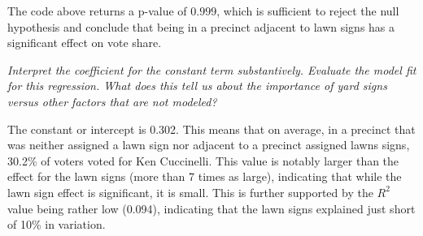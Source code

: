 \documentclass[12pt,a4paper]{article}
\begin{document}


\noindent The code above returns a p-value of $0.999$, which is sufficient to reject the null hypothesis and conclude that being in a precinct adjacent to lawn signs has a significant effect on vote share.

\vspace{.5cm}
\textit{\noindent Interpret the coefficient for the constant term substantively.
Evaluate the model fit for this regression.  What does this	tell us about the importance of yard signs versus other factors that are not modeled?}
\vspace{.25cm}

The constant or intercept is 0.302. This means that on average, in a precinct that was neither assigned a lawn sign nor adjacent to a precinct assigned lawns signs, 30.2\% of voters voted for Ken Cuccinelli. This value is notably larger than the effect for the lawn signs (more than 7 times as large), indicating that while the lawn sign effect is significant, it is small. This is further supported by the $R^{2}$ value being rather low (0.094), indicating that the lawn signs explained just short of 10\% in variation.
\end{document}
